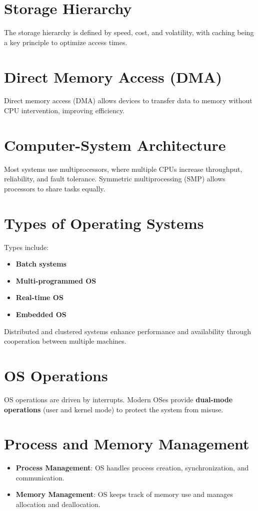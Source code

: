 \documentclass{article}
\begin{document}
\section{Storage Hierarchy}
The storage hierarchy is defined by speed, cost, and volatility, with caching being a key principle to optimize access times.

\section{Direct Memory Access (DMA)}
Direct memory access (DMA) allows devices to transfer data to memory without CPU intervention, improving efficiency.

\section{Computer-System Architecture}
Most systems use multiprocessors, where multiple CPUs increase throughput, reliability, and fault tolerance. Symmetric multiprocessing (SMP) allows processors to share tasks equally.

\section{Types of Operating Systems}
Types include:
\begin{itemize}
    \item \textbf{Batch systems}
    \item \textbf{Multi-programmed OS}
    \item \textbf{Real-time OS}
    \item \textbf{Embedded OS}
\end{itemize}

Distributed and clustered systems enhance performance and availability through cooperation between multiple machines.

\section{OS Operations}
OS operations are driven by interrupts. Modern OSes provide \textbf{dual-mode operations} (user and kernel mode) to protect the system from misuse.

\section{Process and Memory Management}
\begin{itemize}
    \item \textbf{Process Management}: OS handles process creation, synchronization, and communication.
    \item \textbf{Memory Management}: OS keeps track of memory use and manages allocation and deallocation.
\end{itemize}
\end{document}
